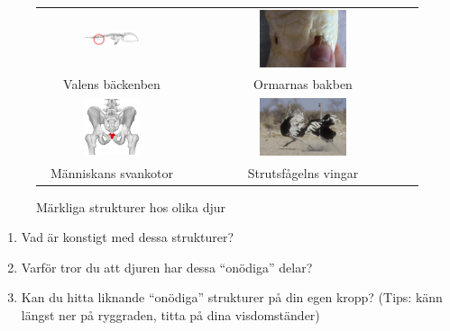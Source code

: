 \documentclass[a4paper,11pt]{article}
\begin{document}
\begin{figure}[H]
\centering
\begin{tabular}{cc}
\includegraphics[width=0.4\textwidth]{whale_pelvis.png} & 
\includegraphics[width=0.4\textwidth]{Anal_spurs.jpg} \\
Valens bäckenben & Ormarnas bakben \\[0.5cm]
\includegraphics[width=0.4\textwidth]{human-coccyx.jpg} & 
\includegraphics[width=0.4\textwidth]{ostrichrunning.jpeg} \\
Människans svankotor & Strutsfågelns vingar \\
\end{tabular}
\caption{Märkliga strukturer hos olika djur}
\end{figure}
\begin{enumerate}
    \item Vad är konstigt med dessa strukturer?
    
    \vspace{2cm}
    
    \item Varför tror du att djuren har dessa ``onödiga'' delar?
    
    \vspace{2cm}
    
    \item Kan du hitta liknande ``onödiga'' strukturer på din egen kropp? (Tips: känn längst ner på ryggraden, titta på dina visdomständer)
    
    \vspace{2cm}
\end{enumerate}
\end{document}

